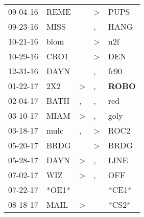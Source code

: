 \begin{supertabular}{p{0.07\textwidth}p{0.06\textwidth}p{0.02\textwidth}p{0.02\textwidth}p{0.06\textwidth}}
          09-04-16\textsuperscript{} &           REME\textsuperscript{} &                  &     \textgreater &           PUPS\textsuperscript{} \\
          09-23-16\textsuperscript{} &           MISS\textsuperscript{} &                  &                , &           HANG\textsuperscript{} \\
          10-21-16\textsuperscript{} &           blom\textsuperscript{} &                  &     \textgreater &            n2f\textsuperscript{} \\
          10-29-16\textsuperscript{} &           CRO1\textsuperscript{} &                  &     \textgreater &            DEN\textsuperscript{} \\
          12-31-16\textsuperscript{} &           DAYN\textsuperscript{} &                  &                , &           fr90\textsuperscript{} \\
          01-22-17\textsuperscript{} &            2X2\textsuperscript{} &     \textgreater &                , &  \textbf{ROBO\textsuperscript{}} \\
          02-04-17\textsuperscript{} &           BATH\textsuperscript{} &                , &                , &            red\textsuperscript{} \\
          03-10-17\textsuperscript{} &           MIAM\textsuperscript{} &     \textgreater &                , &           goly\textsuperscript{} \\
          03-18-17\textsuperscript{} &           mulc\textsuperscript{} &                , &     \textgreater &           ROC2\textsuperscript{} \\
          05-20-17\textsuperscript{} &           BRDG\textsuperscript{} &                  &     \textgreater &           BRDG\textsuperscript{} \\
          05-28-17\textsuperscript{} &           DAYN\textsuperscript{} &     \textgreater &                , &           LINE\textsuperscript{} \\
          07-02-17\textsuperscript{} &            WIZ\textsuperscript{} &     \textgreater &                , &            OFF\textsuperscript{} \\
          07-22-17\textsuperscript{} &                            *OE1* &                  &                  &                            *CE1* \\
          08-18-17\textsuperscript{} &           MAIL\textsuperscript{} &     \textgreater &                  &                            *CS2* \\

\end{supertabular}
